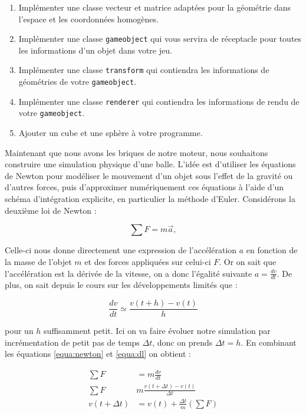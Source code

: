 \documentclass[a4paper,12pt]{article}
\begin{document}
\begin{enumerate}
  \item Implémenter une classe vecteur et matrice adaptées pour la géométrie dans l'espace et les coordonnées homogènes.
  \item Implémenter une classe \texttt{gameobject} qui vous servira de réceptacle pour toutes les informations d'un objet dans votre jeu.
  \item Implémenter une classe \texttt{transform} qui contiendra les informations de géométries de votre \texttt{gameobject}.
  \item Implémenter une classe \texttt{renderer} qui contiendra les informations de rendu de votre \texttt{gameobject}.
  \item Ajouter un cube et une sphère à votre programme.
\end{enumerate}


Maintenant que nous avons les briques de notre moteur, nous souhaitons construire une simulation physique d'une balle. 
L'idée est d'utiliser les équations de Newton pour modéliser le mouvement d'un objet sous l'effet de la gravité ou d'autres forces, puis d'approximer numériquement ces équations à l'aide d'un schéma d'intégration explicite, en particulier la méthode d'Euler. Considérons la deuxième loi de Newton : 

\begin{equation}
    \label{equa:newton}
    \sum F = m\vec{a},
\end{equation}

Celle-ci nous donne directement une expression de l'accélération $a$ en fonction de la masse de l'objet $m$ et des forces appliquées sur celui-ci $F$. Or on sait que l'accélération est la dérivée de la vitesse, on a donc l'égalité suivante $a = \frac{dv}{dt}$. De plus, on sait depuis le cours sur les développements limités que :

\begin{equation}
    \label{equa:dl}
    \frac{dv}{dt} \simeq \frac{v(t+h)-v(t)}{h}
\end{equation}

pour un $h$ suffisamment petit. Ici on va faire évoluer notre simulation par incrémentation de petit pas de temps $\Delta t$, donc on prends $\Delta t = h$. En combinant les équations \eqref{equa:newton} et \eqref{equa:dl} on obtient :

\begin{align}
\sum F &= m \frac{dv}{dt} \\
\sum F & m \frac{v(t+\Delta t)-v(t)}{\Delta t} \\
v(t+\Delta t) &= v(t) + \frac{\Delta t}{m}(\sum F)
\end{align}
\end{document}
